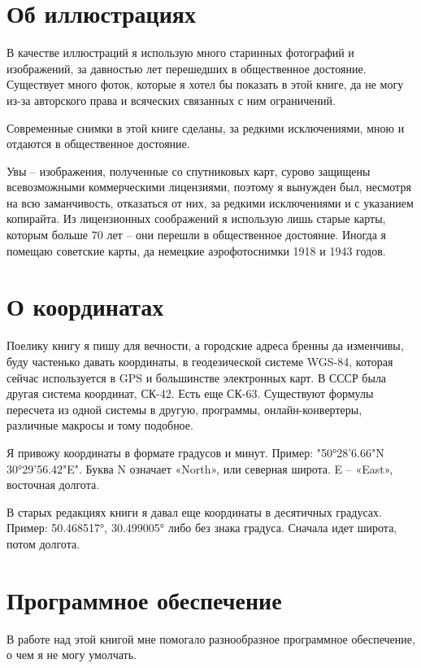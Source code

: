 \section*{Об иллюстрациях} 

В качестве иллюстраций я использую много старинных фотографий и изображений, за давностью лет перешедших в общественное достояние. Существует много фоток, которые я хотел бы показать в этой книге, да не могу из-за авторского права и всяческих связанных с ним ограничений.

Современные снимки в этой книге сделаны, за редкими исключениями, мною и отдаются в общественное достояние.

Увы – изображения, полученные со спутниковых карт, сурово защищены всевозможными коммерческими лицензиями, поэтому я вынужден был, несмотря на всю заманчивость, отказаться от них, за редкими исключениями и с указанием копирайта. Из лицензионных соображений я использую лишь старые карты, которым больше 70 лет – они перешли в общественное достояние. Иногда я помещаю советские карты, да немецкие аэрофотоснимки 1918 и 1943 годов.

\section*{О координатах}

Поелику книгу я пишу для вечности, а городские адреса бренны да изменчивы, буду частенько давать координаты, в геодезической системе WGS-84, которая сейчас используется в GPS и большинстве электронных карт. В СССР была другая система координат, СК-42. Есть еще СК-63. Существуют формулы пересчета из одной системы в другую, программы, онлайн-конвертеры, различные макросы и тому подобное. 

Я привожу координаты в формате градусов и минут. Пример: "50°28'6.66"N 30°29'56.42"E". Буква N означает «North», или северная широта. E – «East», восточная долгота.

В старых редакциях книги я давал еще координаты в десятичных градусах. Пример: 50.468517°, 30.499005° либо без знака градуса. Сначала идет широта, потом долгота. 

\section*{Программное обеспечение} 

В работе над этой книгой мне помогало разнообразное программное обеспечение, о чем я не могу умолчать.

